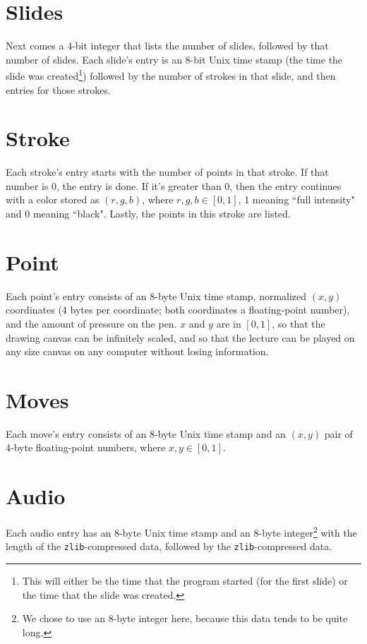\documentclass[12pt]{report}
\begin{document}
\section{Slides}
Next comes a 4-bit integer that lists the number of slides, followed by that number of slides.  Each slide's entry is an 8-bit Unix time stamp (the time the slide was created\footnote{This will either be the time that the program started (for the first slide) or the time that the slide was created.}) followed by the number of strokes in that slide, and then entries for those strokes.

\section{Stroke}
Each stroke's entry starts with the number of points in that stroke.  If that number is 0, the entry is done.  If it's greater than 0, then the entry continues with a color stored as $(r,g,b)$, where $r,g,b\in[0,1]$, 1 meaning ``full intensity" and 0 meaning ``black".  Lastly, the points in this stroke are listed.

\section{Point}
Each point's entry consists of an 8-byte Unix time stamp, normalized $(x,y)$ coordinates (4 bytes per coordinate; both coordinates a floating-point number), and the amount of pressure on the pen.  $x$ and $y$ are in $[0,1]$, so that the drawing canvas can be infinitely scaled, and so that the lecture can be played on any size canvas on any computer without losing information.

\section{Moves}
Each move's entry consists of an 8-byte Unix time stamp and an $(x,y)$ pair of 4-byte floating-point numbers, where $x,y\in[0,1]$.

\section{Audio}
Each audio entry has an 8-byte Unix time stamp and an 8-byte integer\footnote{We chose to use an 8-byte integer here, because this data tends to be quite long.} with the length of the {\tt zlib}-compressed data, followed by the {\tt zlib}-compressed data.
\end{document}
